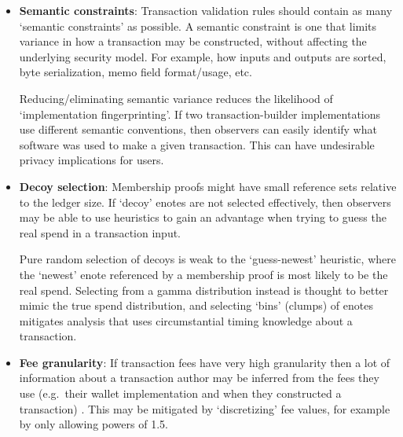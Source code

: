 \begin{itemize}
    \item \textbf{Semantic constraints}: Transaction validation rules should contain as many `semantic constraints' as possible. A semantic constraint is one that limits variance in how a transaction may be constructed, without affecting the underlying security model. For example, how inputs and outputs are sorted, byte serialization, memo field format/usage, etc.

    Reducing/eliminating semantic variance reduces the likelihood of `implementation fingerprinting'. If two transaction-builder implementations use different semantic conventions, then observers can easily identify what software was used to make a given transaction. This can have undesirable privacy implications for users.

    \item \textbf{Decoy selection}: Membership proofs might have small reference sets relative to the ledger size. If `decoy' enotes are not selected effectively, then observers may be able to use heuristics to gain an advantage when trying to guess the real spend in a transaction input.

    Pure random selection of decoys is weak to the `guess-newest' heuristic, where the `newest' enote referenced by a membership proof is most likely to be the real spend. Selecting from a gamma distribution instead is thought to better mimic the true spend distribution, and selecting `bins' (clumps) of enotes mitigates analysis that uses circumstantial timing knowledge about a transaction. \cite{AnalysisOfLinkability, foundations-ring-sampling}

    \item \textbf{Fee granularity}: If transaction fees have very high granularity then a lot of information about a transaction author may be inferred from the fees they use (e.g.\ their wallet implementation and when they constructed a transaction) \cite{visualizing-monero-vid}. This may be mitigated by `discretizing' fee values, for example by only allowing powers of 1.5.
\end{itemize}
